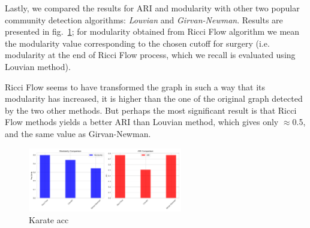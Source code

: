 Lastly, we compared the results for ARI and modularity with other two popular community detection algorithms: \textit{Louvian} and \textit{Girvan-Newman}. Results are presented in fig.~\ref{fig:Karate_Comparison}; for modularity obtained from Ricci Flow algorithm we mean the modularity value corresponding to the chosen cutoff for surgery (i.e. modularity at the end of Ricci Flow process, which we recall is evaluated using Louvian method). 

Ricci Flow seems to have transformed the graph in such a way that its modularity has increased, it is higher than the one of the original graph detected by the two other methods. But perhaps the most significant result is that Ricci Flow methods yields a better ARI than Louvian method, which gives only $\approx$0.5, and the same value as Girvan-Newman.
\begin{figure}
    \centering
    \includegraphics[width=0.6\textwidth]{../KarateClubResults/Comparison.png}
    \caption{Karate acc}
    \label{fig:Karate_Comparison}
\end{figure}